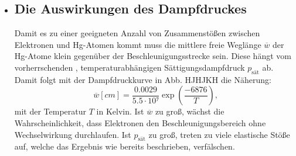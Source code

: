 \begin{itemize}
\item\subsection{Die Auswirkungen des Dampfdruckes}
Damit es zu einer geeigneten Anzahl von Zusammenstößen zwischen Elektronen und Hg-Atomen
kommt muss die mittlere freie Weglänge $\overline{w}$ der Hg-Atome klein gegenüber
der Beschleunigungsstrecke sein. Diese hängt vom vorherrschenden , temperaturabhängigen
Sättigungsdampfdruck $p_\text{sät}$ ab. Damit folgt mit der Dampfdruckkurve in Abb. HJHJKH die Näherung:
\begin{equation}
  \overline{w} [cm] = \frac{0.0029}{5.5 \cdot 10⁷} \exp \left(\frac{-6876}{T}\right)\text{,}
  \end{equation}
  mit der Temperatur $T$ in Kelvin. Ist $\overline{w}$ zu groß, wächst die Wahrscheinlichkeit,
  dass Elektronen den Beschleunigungsbereich ohne Wechselwirkung durchlaufen. Ist
  $p_\text{sät}$ zu groß, treten zu viele elastische Stöße auf, welche das Ergebnis
  wie bereits beschrieben, verfälschen.
\end{itemize}
